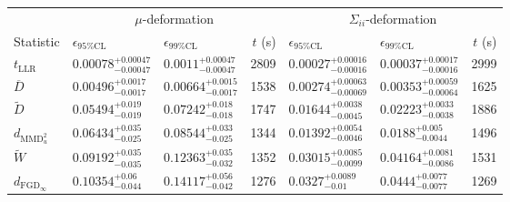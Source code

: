 
\begin{landscape}
    \begin{tabular}{l|llr|llr}
\toprule
\multicolumn{1}{c}{} & \multicolumn{3}{c}{$\mu$-deformation} & \multicolumn{3}{c}{$\Sigma_{ii}$-deformation} \\
Statistic & $\epsilon_{95\%\mathrm{CL}}$ & $\epsilon_{99\%\mathrm{CL}}$ & $t$ (s) & $\epsilon_{95\%\mathrm{CL}}$ & $\epsilon_{99\%\mathrm{CL}}$ & $t$ (s) \\
\midrule
$t_{\mathrm{LLR}}$ & $0.00078_{-0.00047}^{+0.00047}$ & $0.0011_{-0.00047}^{+0.00047}$ & 2809 & $0.00027_{-0.00016}^{+0.00016}$ & $0.00037_{-0.00016}^{+0.00017}$ & 2999 \\
$\overline{D}$ & $0.00496_{-0.0017}^{+0.0017}$ & $0.00664_{-0.0017}^{+0.0015}$ & 1538 & $0.00274_{-0.00069}^{+0.00063}$ & $0.00353_{-0.00064}^{+0.00059}$ & 1625 \\
$\widetilde{D}$ & $0.05494_{-0.019}^{+0.019}$ & $0.07242_{-0.018}^{+0.018}$ & 1747 & $0.01644_{-0.0045}^{+0.0038}$ & $0.02223_{-0.0038}^{+0.0033}$ & 1886 \\
$d_{\mathrm{MMD}^{2}_{u}}$ & $0.06434_{-0.025}^{+0.035}$ & $0.08544_{-0.025}^{+0.033}$ & 1344 & $0.01392_{-0.0046}^{+0.0054}$ & $0.0188_{-0.0044}^{+0.005}$ & 1496 \\
$\widetilde{W}$ & $0.09192_{-0.035}^{+0.035}$ & $0.12363_{-0.032}^{+0.035}$ & 1352 & $0.03015_{-0.0099}^{+0.0085}$ & $0.04164_{-0.0086}^{+0.0081}$ & 1531 \\
$d_{\mathrm{FGD}_{\infty}}$ & $0.10354_{-0.044}^{+0.06}$ & $0.14117_{-0.042}^{+0.056}$ & 1276 & $0.0327_{-0.01}^{+0.0089}$ & $0.0444_{-0.0077}^{+0.0077}$ & 1269 \\
\bottomrule
\end{tabular}


\end{landscape}
